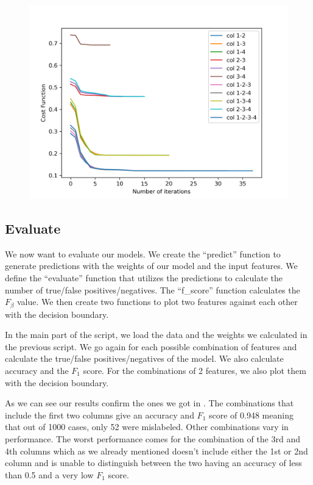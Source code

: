 \documentclass[a4paper,10pt]{article}
\begin{document}
\begin{figure}[H]
  \centering
  \includegraphics[width=.7\linewidth]{./plots/training.png}
  \caption{}
  \label{fig:train}
\end{figure}

\subsection{Evaluate}

We now want to evaluate our models. We create the ``predict'' function to generate predictions with the weights of our model and the input features. We define the ``evaluate'' function that utilizes the predictions to calculate the number of
true/false positives/negatives. The ``f\_score'' function calculates the $F_{\beta}$ value. We then create two functions to plot two features against each other with the decision boundary. 



In the main part of the script, we load the data and the weights we calculated in the previous script. We go again for each possible combination of features and calculate the true/false positives/negatives of the model. We also calculate accuracy and the $F_1$ score. For the combinations of 2 features, we also plot them with the decision boundary.



As we can see our results confirm the ones we got in . The combinations that include the first two columns give an accuracy and $F_1$ score of 0.948 meaning that out of 1000 cases, only 52 were mislabeled. Other combinations vary in performance. The worst performance comes for the combination of the 3rd and 4th columns which as we already mentioned doesn't include either the 1st or 2nd column and is unable to distinguish between the two having an accuracy of less than 0.5 and a very low $F_1$ score. 
\end{document}
